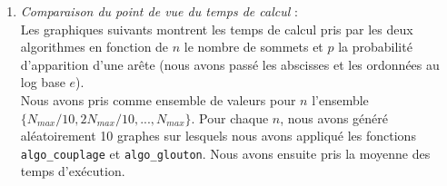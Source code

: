 \documentclass[12pt]{article}
\begin{document}
        \begin{enumerate}
            \item \textit{Comparaison du point de vue du temps de calcul} : \\
                Les graphiques suivants montrent les temps de calcul pris par les deux algorithmes en fonction de $n$ le nombre de sommets et $p$ la probabilité d'apparition d'une arête (nous avons passé les abscisses et les ordonnées au log base $e$). \\
                Nous avons pris comme ensemble de valeurs pour $n$ l'ensemble $\{N_{max}/10, 2N_{max}/10,..., N_{max}\}$. Pour chaque $n$, nous avons généré aléatoirement 10 graphes sur lesquels nous avons appliqué les fonctions \texttt{algo\_couplage} et \texttt{algo\_glouton}. Nous avons ensuite pris la moyenne des temps d'exécution. \\


\end{enumerate}
\end{document}
